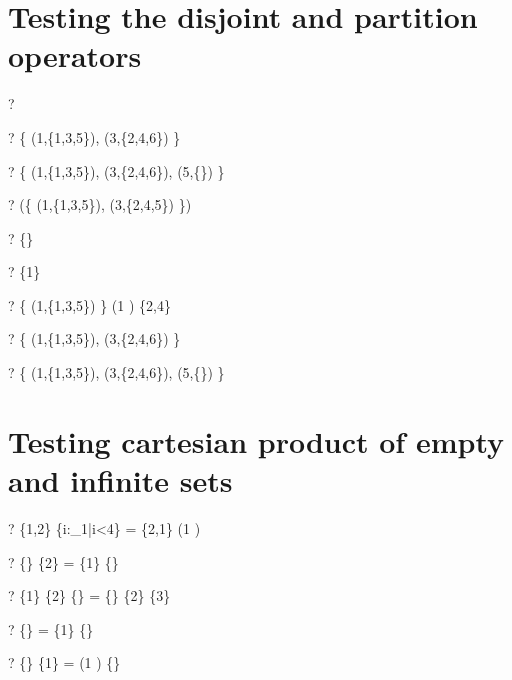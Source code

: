 \documentclass{article}
\begin{document}
\section{Testing the disjoint and partition operators}
\begin{zed} \vdash? \disjoint {} \end{zed}
\begin{zed} \vdash? \disjoint \{ (1,\{1,3,5\}), (3,\{2,4,6\}) \} \end{zed}
\begin{zed} \vdash? \disjoint \{ (1,\{1,3,5\}), (3,\{2,4,6\}), (5,\{\}) \} \end{zed}
\begin{zed} \vdash? \lnot (\disjoint \{ (1,\{1,3,5\}), (3,\{2,4,5\}) \}) \end{zed}

\begin{zed} \vdash? \emptyset[\nat \cross \power\nat] \partition \{\} \end{zed}
\begin{zed} \vdash? \lnot \emptyset[\nat \cross \power\nat] \partition \{1\} \end{zed}
\begin{zed} \vdash? \{ (1,\{1,3,5\}) \} \partition (1 ) \setminus \{2,4\} \end{zed}
\begin{zed} \vdash? \{ (1,\{1,3,5\}), (3,\{2,4,6\}) \}   \end{zed}
\begin{zed} \vdash? \{ (1,\{1,3,5\}), (3,\{2,4,6\}), (5,\{\}) \}   \end{zed}


\section{Testing cartesian product of empty and infinite sets}
\begin{zed} \vdash? \{1,2\} \cross \{i:\nat_1|i<4\} = \{2,1\} \cross (1 ) \end{zed}
\begin{zed} \vdash? \{\} \cross \{2\} = \{1\} \cross \{\} \end{zed}
\begin{zed} \vdash? \{1\} \cross \{2\} \cross \{\} = \{\} \cross \{2\} \cross \{3\} \end{zed}
\begin{zed} \vdash? \{\} \cross \emptyset[\num] = \{1\} \cross \{\} \end{zed}
\begin{zed} \vdash? \{\} \cross \{1\} = (1 ) \cross \{\} \end{zed}
\end{document}
